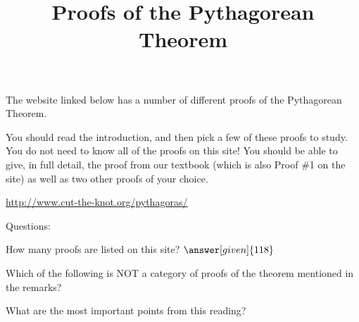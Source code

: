 \documentclass[nooutcomes]{ximera}
\title{Proofs of the Pythagorean Theorem}
\begin{document}
\begin{abstract}
    
\end{abstract}
\maketitle

The website linked below has a number of different proofs of the Pythagorean Theorem.  

You should read the introduction, and then pick a few of these proofs to study.  You do not need to know all of the proofs on this site!  You should be able to give, in full detail, the proof from our textbook (which is also Proof \#1 on the site) as well as two other proofs of your choice.

\url{http://www.cut-the-knot.org/pythagoras/}

Questions:

\begin{question}
How many proofs are listed on this site?
$\answer[given]{118}$
\end{question}

\begin{question}
Which of the following is NOT a category of proofs of the theorem mentioned in the remarks?
\begin{multipleChoice}
\end{multipleChoice}
\end{question}


\begin{question}
What are the most important points from this reading?
\begin{freeResponse}
\end{freeResponse}

\end{question}
\end{document}
